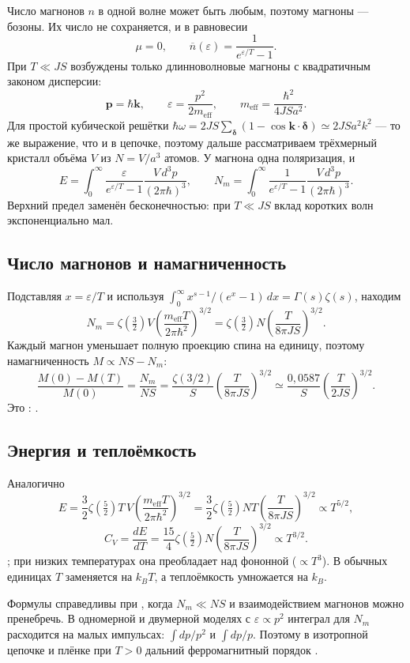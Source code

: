 \documentclass[../final.tex]{subfiles}
\begin{document}
Число магнонов $n$ в одной волне может быть любым, поэтому магноны ---
бозоны. Их число не сохраняется, и в равновесии
\[
 \mu=0,\qquad \overline n(\varepsilon)=\frac1{e^{\varepsilon/T}-1}.
\]
При $T\ll JS$ возбуждены только длинноволновые магноны с квадратичным
законом дисперсии:
\[
 \boldsymbol p=\hbar\boldsymbol k,\qquad
 \varepsilon=\frac{p^2}{2m_{\mathrm{eff}}},\qquad
 m_{\mathrm{eff}}=\frac{\hbar^2}{4JSa^2}.
\]
Для простой кубической решётки
$\hbar\omega=2JS\sum_{\boldsymbol\delta}(1-\cos\boldsymbol k\cdot\boldsymbol\delta)
\simeq2JSa^2k^2$ --- то же выражение, что и в цепочке, поэтому
дальше рассматриваем трёхмерный кристалл объёма $V$ из $N=V/a^3$ атомов.
У магнона одна поляризация, и
\[
 E=\int_0^\infty\frac{\varepsilon}{e^{\varepsilon/T}-1}
 \frac{V\,d^3p}{(2\pi\hbar)^3},\qquad
 N_m=\int_0^\infty\frac1{e^{\varepsilon/T}-1}
 \frac{V\,d^3p}{(2\pi\hbar)^3}.
\]
Верхний предел заменён бесконечностью: при $T\ll JS$ вклад
коротких волн экспоненциально мал.

\subsection*{Число магнонов и намагниченность}
Подставляя $x=\varepsilon/T$ и используя
$\int_0^\infty x^{s-1}/(e^x-1)\,dx=\Gamma(s)\zeta(s)$, находим
\[
 N_m=\zeta\left(\tfrac32\right)V
 \left(\frac{m_{\mathrm{eff}}T}{2\pi\hbar^2}\right)^{3/2}
 =\zeta\left(\tfrac32\right)N\left(\frac{T}{8\pi JS}\right)^{3/2}.
\]
Каждый магнон уменьшает полную проекцию спина на единицу, поэтому
намагниченность $M\propto NS-N_m$:
\[
 \frac{M(0)-M(T)}{M(0)}=\frac{N_m}{NS}
 =\frac{\zeta(3/2)}S\left(\frac{T}{8\pi JS}\right)^{3/2}
 \simeq\frac{0{,}0587}S\left(\frac{T}{2JS}\right)^{3/2}.
\]
Это : .

\subsection*{Энергия и теплоёмкость}
Аналогично
\[
 E=\frac32\zeta\left(\tfrac52\right)T\,V
 \left(\frac{m_{\mathrm{eff}}T}{2\pi\hbar^2}\right)^{3/2}
 =\frac32\zeta\left(\tfrac52\right)NT
 \left(\frac{T}{8\pi JS}\right)^{3/2}\propto T^{5/2},
\]
\[
 C_V=\frac{dE}{dT}
 =\frac{15}4\zeta\left(\tfrac52\right)N
 \left(\frac{T}{8\pi JS}\right)^{3/2}\propto T^{3/2}.
\]
; при низких
температурах она преобладает над фононной ($\propto T^3$).
В обычных единицах $T$ заменяется на $k_BT$, а теплоёмкость умножается
на $k_B$.

Формулы справедливы при , когда $N_m\ll NS$
и взаимодействием магнонов можно пренебречь. В одномерной и двумерной
моделях с $\varepsilon\propto p^2$ интеграл для $N_m$ расходится
на малых импульсах: $\int dp/p^2$ и $\int dp/p$. Поэтому в изотропной
цепочке и плёнке при $T>0$ дальний ферромагнитный порядок
.
\end{document}

